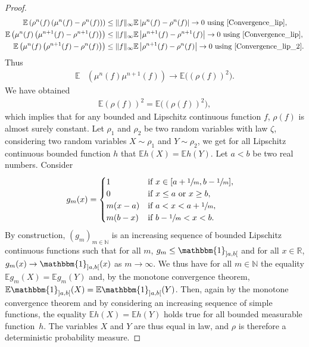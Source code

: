 \documentclass[10pt]{amsart}
\let\mathds\mathbbm
\theoremstyle{plain}
\theoremstyle{definition}
\begin{document}
\begin{proof}
\begin{align*}
\mathbb{E}\left(\rho^n(f)\left(\mu^n(f)-\rho^n(f)\right)\right)&\leq \|f\|_{\infty}\mathbb{E}\left|\mu^n(f)-\rho^n(f)\right|\to0\text{ using \eqref{Convergence_lip}},\\
\mathbb{E}\left(\mu^n(f)\left(\mu^{n+1}(f)-\rho^{n+1}(f)\right)\right)&\leq \|f\|_{\infty}\mathbb{E}\left|\mu^{n+1}(f)-\rho^{n+1}(f)\right|\to0\text{ using \eqref{Convergence_lip}},\\
\mathbb{E}\left(\mu^n(f)\left(\rho^{n+1}(f)-\rho^{n}(f)\right)\right)&\leq \|f\|_{\infty}\mathbb{E}\left|\rho^{n+1}(f)-\rho^{n}(f)\right|\to0\text{ using \eqref{Convergence_lip_2}}.
\end{align*}
Thus
\begin{align*}
\mathbb{E}&\left(\mu^{n}(f)\mu^{n+1}(f)\right)\to\mathbb{E}\bigl(\left(\rho(f)\right)^2\bigr).
\end{align*}
We have obtained
\begin{align*}
\mathbb{E}\left(\rho(f)\right)^2=\mathbb{E}\bigl(\left(\rho(f)\right)^2\bigr),
\end{align*}
which implies that for any bounded and Lipschitz continuous function $f$, $\rho(f)$ is almost surely constant. Let $\rho_1$ and $\rho_2$ be two random variables with law $\zeta$, considering two random variables $X\sim\rho_1$ and $Y\sim\rho_2$, we get for all Lipschitz continuous bounded function $h$ that $\mathbb{E}h(X)=\mathbb{E}h(Y)$. Let $a<b$ be two real numbers. Consider
\begin{align*}
g_m(x)&=\begin{cases}
1 &\text{if }x\in[a+\sfrac{1}{m},b-\sfrac{1}{m}],\\
0 &\text{if }x\leq a\text{ or }x\geq b,\\
m(x-a)&\text{if }a<x<a+\sfrac{1}{m},\\
m(b-x)&\text{if }b-\sfrac{1}{m}<x<b.
\end{cases}
\end{align*}
By construction, $(g_m)_{m\in\mathbb{N}}$ is an increasing sequence of bounded Lipschitz continuous functions such that for all $m$, $g_m\leq\mathds{1}_{]a,b[}$ and for all $x\in\mathbb{R}$, $g_m(x)\to\mathds{1}_{]a,b[}(x)$ as $m\to\infty$. We thus have for all $m\in\mathbb{N}$ the equality $\mathbb{E}g_m(X)=\mathbb{E}g_m(Y)$ and, by the monotone convergence theorem, $\mathbb{E}\mathds{1}_{]a,b[}(X)=\mathbb{E}\mathds{1}_{]a,b[}(Y)$. Then, again by the monotone convergence theorem and by considering an increasing sequence of simple functions, the equality $\mathbb{E}h(X)=\mathbb{E}h(Y)$ holds true for all bounded measurable function~$h$. The variables $X$ and $Y$ are thus equal in law, and $\rho$ is therefore a deterministic probability measure.
\end{proof}
\end{document}
